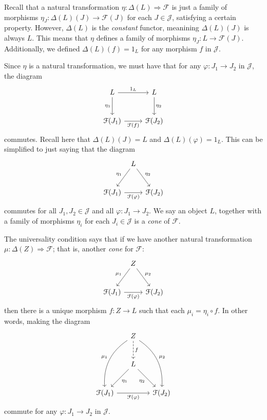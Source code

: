 Recall that a natural transformation $\eta : \Delta (L) \Rightarrow \mathcal{F} $ is just a family of morphisms $\eta _J : \Delta (L)(J) \to \mathcal{F} (J)$ for each $J\in \mathcal{J} $, satisfying a certain property. However, $\Delta (L)$ is the \emph{constant} functor, meanining $\Delta (L)(J)$ is always $L$. This means that $\eta $ defines a family of morphisms $\eta _J : L \to \mathcal{F} (J)$. Additionally, we defined $\Delta (L)(f)=1_L$ for any morphism $f$ in $\mathcal{J} $.

Since $\eta $ is a natural transformation, we must have that for any $\varphi  : J_1 \to J_2$ in $\mathcal{J} $, the diagram
\[\begin{tikzcd}[row sep = 2.5em, column sep = 2.5em]
	L\ar[" 1_L ", r] \ar[" \eta_{1}  "', d]  & L\ar[" \eta _{2}  ", d]  \\
\mathcal{F} (J_1)\ar[" \mathcal{F} (f) "', r]  & \mathcal{F} (J_2)
\end{tikzcd}\]
commutes. Recall here that $\Delta (L)(J)=L$ and $\Delta (L)(\varphi )=1_L$. This can be simplified to just saying that the diagram
\[\begin{tikzcd}[row sep = 2.5em, column sep = 0.5em]
 & L\ar[" \eta_{1} "', dl] \ar[" \eta_{2}  ", dr]  &  \\
\mathcal{F} (J_1)\ar[" \mathcal{F} (\varphi ) "', rr]  &  & \mathcal{F} (J_2)
\end{tikzcd}\]
commutes for all $J_1,J_2\in \mathcal{J} $ and all $\varphi  : J_1 \to J_2$. We say an object $L$, together with a family of morphisms $\eta_i$ for each $J_i\in \mathcal{J} $ is a \emph{cone} of $\mathcal{F} $.

The universality condition says that if we have another natural transformation $\mu : \Delta (Z) \Rightarrow \mathcal{F} $; that is, another \emph{cone} for $\mathcal{F} $:
\[\begin{tikzcd}[row sep = 2.5em, column sep = 0.5em]
 & Z\ar[" \mu _{1} "', dl] \ar[" \mu _{2}  ", dr]  &  \\
\mathcal{F} (J_1)\ar[" \mathcal{F} (\varphi ) "', rr]  &  & \mathcal{F} (J_2)
\end{tikzcd}\]
then there is a unique morphism $f : Z \to L$ such that each $\mu_i=\eta_i\circ f$. In other words, making the diagram
\[\begin{tikzcd}[row sep = 2.5em, column sep = 1.5em]
 & Z\ar[bend right, " \mu_1 "', ddl] \ar[bend left, " \mu _2 ", ddr] \ar[dashed, " f ", d]  &  \\
 & L\ar[" \eta _1 ", dl] \ar[" \eta _2 "', dr]  &  \\
\mathcal{F} (J_1)\ar[" \mathcal{F} (\varphi ) "', rr]  &  & \mathcal{F} (J_2)
\end{tikzcd}\]
commute for any $\varphi : J_1 \to J_2$ in $\mathcal{J} $.

